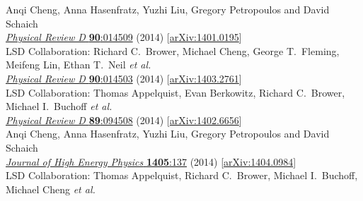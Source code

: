 \begin{spacelistout}
\begin{revnumerate}
      Anqi Cheng, Anna Hasenfratz, Yuzhi Liu, Gregory Petropoulos and David Schaich \\
      \href{http://dx.doi.org/10.1103/PhysRevD.90.014509}{\textit{Physical Review D} \textbf{90}:014509} (2014) [\href{http://arxiv.org/abs/1401.0195}{arXiv:1401.0195}]
    \pagebreakitem
       \\
      LSD Collaboration: Richard C.~Brower, Michael Cheng, George T.~Fleming, Meifeng Lin, Ethan T.~Neil \textit{et al.} \\ %
      \href{http://dx.doi.org/10.1103/PhysRevD.90.014503}{\textit{Physical Review D} \textbf{90}:014503} (2014) [\href{http://arxiv.org/abs/1403.2761}{arXiv:1403.2761}]%
    \pagebreakitem
       \\
      LSD Collaboration: Thomas Appelquist, Evan Berkowitz, Richard C.~Brower, Michael I.~Buchoff \textit{et al.} \\ %
      \href{http://dx.doi.org/10.1103/PhysRevD.89.094508}{\textit{Physical Review D} \textbf{89}:094508} (2014) [\href{http://arxiv.org/abs/1402.6656}{arXiv:1402.6656}]
    \pagebreakitem
       \\
      Anqi Cheng, Anna Hasenfratz, Yuzhi Liu, Gregory Petropoulos and David Schaich \\
      \href{http://dx.doi.org/10.1007/JHEP05(2014)137}{\textit{Journal of High Energy Physics} \textbf{1405}:137} (2014) [\href{http://arxiv.org/abs/1404.0984}{arXiv:1404.0984}]
    \pagebreakitem
       \\
      LSD Collaboration: Thomas Appelquist, Richard C.~Brower, Michael I.~Buchoff, Michael Cheng \textit{et al.} \\ %

\end{revnumerate}
\end{spacelistout}
